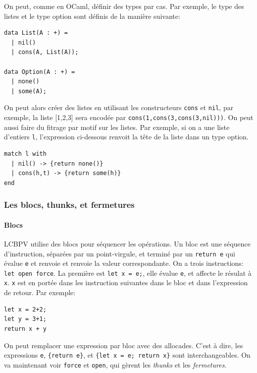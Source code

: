 \documentclass[12pt]{article}
\begin{document}
On peut, comme en OCaml, définir des types par cas. Par exemple, le type
des listes et le type option sont définis de la manière suivante:

\begin{verbatim}
data List(A : +) =
  | nil()
  | cons(A, List(A));

data Option(A : +) =
  | none()
  | some(A);
\end{verbatim}

On peut alors créer des listes en utilisant les constructeurs
\texttt{cons} et \texttt{nil}, par exemple, la liste {[}1,2,3{]} sera
encodée par \texttt{cons(1,cons(3,cons(3,nil)))}. On peut aussi faire du
fitrage par motif sur les listes. Par exemple, si on a une liste
d'entiers \texttt{l}, l'expression ci-dessous renvoit la tête de la
liste dans un type option.

\begin{verbatim}
match l with 
  | nil() -> {return none()}
  | cons(h,t) -> {return some(h)}
end 
\end{verbatim}

\hypertarget{les-blocs-thunks-et-fermetures}{%
      \subsubsection*{Les blocs, thunks, et
            fermetures}\label{les-blocs-thunks-et-fermetures}}

\hypertarget{blocs}{%
      \paragraph*{Blocs}\label{blocs}}

LCBPV utilise des blocs pour séquencer les opérations. Un bloc est une
séquence d'instruction, séparées par un point-virgule, et terminé par un
\texttt{return\ e} qui évalue \texttt{e} et renvoie et renvoie la valeur
correspondante. On a trois instructions: \texttt{let\ open\ force}. La
première est \texttt{let\ x\ =\ e;}, elle évalue \texttt{e}, et affecte
le résulat à \texttt{x}. \texttt{x} est en portée dans les instruction
suivantes dans le bloc et dans l'expression de retour. Par exemple:

\begin{verbatim}
let x = 2+2;
let y = 3+1;
return x + y
\end{verbatim}

On peut remplacer une expression par bloc avec des allocades. C'est à
dire, les expressions \texttt{e}, \texttt{\{return\ e\}}, et
\texttt{\{let\ x\ =\ e;\ return\ x\}} sont interchangeables. On va
maintenant voir \texttt{force} et \texttt{open}, qui gèrent les
\emph{thunks} et les \emph{fermetures}.
\end{document}
